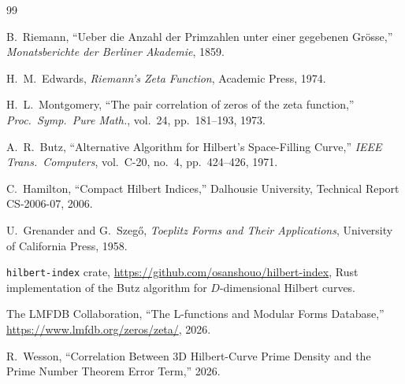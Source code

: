 \documentclass[11pt,a4paper]{article}
\begin{document}
\begin{thebibliography}{99}

B.~Riemann, ``Ueber die Anzahl der Primzahlen unter einer gegebenen
Gr\"{o}sse,'' \emph{Monatsberichte der Berliner Akademie}, 1859.

H.~M.~Edwards, \emph{Riemann's Zeta Function}, Academic Press, 1974.

H.~L.~Montgomery, ``The pair correlation of zeros of the zeta function,''
\emph{Proc.\ Symp.\ Pure Math.}, vol.~24, pp.~181--193, 1973.

A.~R.~Butz, ``Alternative Algorithm for Hilbert's Space-Filling Curve,''
\emph{IEEE Trans.\ Computers}, vol.~C-20, no.~4, pp.~424--426, 1971.

C.~Hamilton, ``Compact Hilbert Indices,'' Dalhousie University, Technical
Report CS-2006-07, 2006.

U.~Grenander and G.~Szeg\H{o}, \emph{Toeplitz Forms and Their
Applications}, University of California Press, 1958.

\texttt{hilbert-index} crate, \url{https://github.com/osanshouo/hilbert-index},
Rust implementation of the Butz algorithm for $D$-dimensional Hilbert curves.

The LMFDB Collaboration, ``The L-functions and Modular Forms Database,''
\url{https://www.lmfdb.org/zeros/zeta/}, 2026.

R.~Wesson, ``Correlation Between 3D Hilbert-Curve Prime Density and the
Prime Number Theorem Error Term,'' 2026.

\end{thebibliography}
\end{document}
